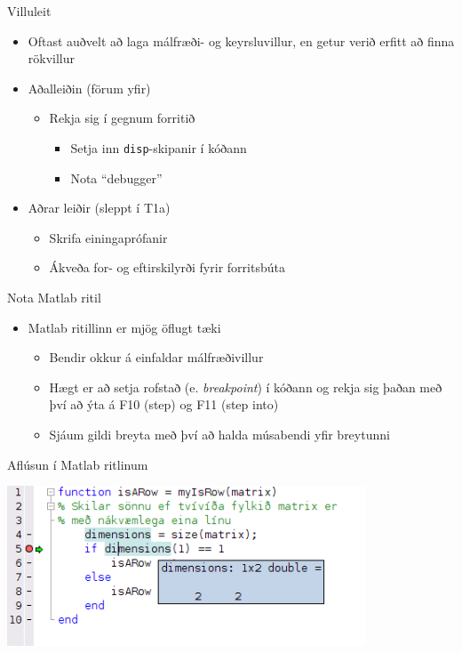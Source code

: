 \documentclass{beamer}
\begin{document}
\begin{frame}{Villuleit}
\begin{itemize}
    \item Oftast auðvelt að laga málfræði- og keyrsluvillur, en getur verið erfitt að finna rökvillur
    \item Aðalleiðin (förum yfir)
    \begin{itemize}
        \item Rekja sig í gegnum forritið
        \begin{itemize}
            \item Setja inn \texttt{disp}-skipanir í kóðann
            \item Nota ``debugger''
        \end{itemize}
    \end{itemize}
    \item Aðrar leiðir (sleppt í T1a)
    \begin{itemize}
        \item Skrifa einingaprófanir
        \item Ákveða for- og eftirskilyrði fyrir forritsbúta
    \end{itemize}
\end{itemize}
\end{frame}

\begin{frame}{Nota Matlab ritil}
\begin{itemize}
 \item Matlab ritillinn er mjög öflugt tæki
 \begin{itemize}
  \item Bendir okkur á einfaldar málfræðivillur
  \item Hægt er að setja rofstað (e. \emph{breakpoint}) í kóðann og rekja sig þaðan með því að ýta á F10 (step) og F11 (step into)
  \item Sjáum gildi breyta með því að halda músabendi yfir breytunni
 \end{itemize}
\end{itemize}
\end{frame}

\begin{frame}{Aflúsun í Matlab ritlinum}
\begin{center}
\includegraphics[width=0.8\textwidth]{Pics/debugging}
\end{center}
\end{frame}
\end{document}
